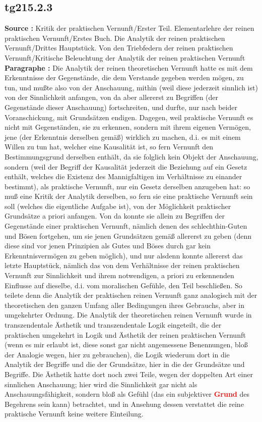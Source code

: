 \documentclass[a4paper,12pt,twoside]{book}
\newcommand{\match}[1]{\textcolor{red}{\textbf{#1}}}
\begin{document}
	\subsection*{tg215.2.3} 
	\textbf{Source : }Kritik der praktischen Vernunft/Erster Teil. Elementarlehre der reinen praktischen Vernunft/Erstes Buch. Die Analytik der reinen praktischen Vernunft/Drittes Hauptstück. Von den Triebfedern der reinen praktischen Vernunft/Kritische Beleuchtung der Analytik der reinen praktischen Vernunft\\  
	
	\noindent\textbf{Paragraphe : }Die Analytik der reinen theoretischen Vernunft hatte es mit dem Erkenntnisse der Gegenstände, die dem Verstande gegeben werden mögen, zu tun, und mußte also von der Anschauung, mithin (weil diese jederzeit sinnlich ist) von der Sinnlichkeit anfangen, von da aber allererst zu Begriffen (der Gegenstände dieser Anschauung) fortschreiten, und durfte, nur nach beider Voranschickung, mit Grundsätzen endigen. Dagegen, weil praktische Vernunft es nicht mit Gegenständen, sie zu erkennen, sondern mit ihrem eigenen Vermögen, jene (der Erkenntnis derselben gemäß) wirklich zu machen, d.i. es mit einem Willen zu tun hat, welcher eine Kausalität ist, so fern Vernunft den Bestimmungsgrund derselben enthält, da sie folglich kein Objekt der Anschauung, sondern (weil der Begriff der Kausalität jederzeit die Beziehung auf ein Gesetz enthält, welches die Existenz des Mannigfaltigen im Verhältnisse zu einander bestimmt), als praktische Vernunft, nur ein Gesetz derselben anzugeben hat: so muß eine Kritik der Analytik derselben, so fern sie eine praktische Vernunft sein soll (welches die eigentliche Aufgabe ist), von der Möglichkeit praktischer Grundsätze a priori anfangen. Von da konnte sie allein zu Begriffen der Gegenstände einer praktischen Vernunft, nämlich denen des schlechthin-Guten und Bösen fortgehen, um sie jenen Grundsätzen gemäß allererst zu geben (denn diese sind vor jenen Prinzipien als Gutes und Böses durch gar kein Erkenntnisvermögen zu geben möglich), und nur alsdenn konnte allererst das letzte Hauptstück, nämlich das von dem Verhältnisse der reinen praktischen Vernunft zur Sinnlichkeit und ihrem notwendigen, a priori zu erkennenden Einflusse auf dieselbe, d.i. vom moralischen Gefühle, den Teil beschließen. So teilete  denn die Analytik der praktischen reinen Vernunft ganz analogisch mit der theoretischen den ganzen Umfang aller Bedingungen ihres Gebrauchs, aber in umgekehrter Ordnung. Die Analytik der theoretischen reinen Vernunft wurde in transzendentale Ästhetik und transzendentale Logik eingeteilt, die der praktischen umgekehrt in Logik und Ästhetik der reinen praktischen Vernunft (wenn es mir erlaubt ist, diese sonst gar nicht angemessene Benennungen, bloß der Analogie wegen, hier zu gebrauchen), die Logik wiederum dort in die Analytik der Begriffe und die der Grundsätze, hier in die der Grundsätze und Begriffe. Die Ästhetik hatte dort noch zwei Teile, wegen der doppelten Art einer sinnlichen Anschauung; hier wird die Sinnlichkeit gar nicht als Anschauungsfähigkeit, sondern bloß als Gefühl (das ein subjektiver \match{Grund} des Begehrens sein kann) betrachtet, und in Ansehung dessen verstattet die reine praktische Vernunft keine weitere Einteilung. 
	
\end{document}

